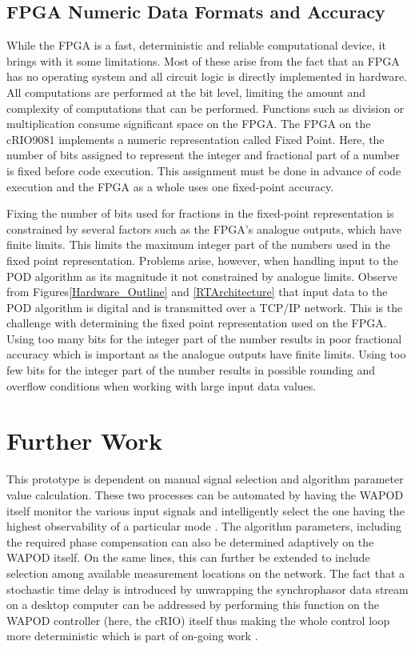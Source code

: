 \documentclass{ieeeaccess}
\begin{document}
\subsection{FPGA Numeric Data Formats and Accuracy}

While the FPGA is a fast, deterministic and reliable computational device, it brings with it some limitations. Most of these arise from the fact that an FPGA has no operating system and all circuit logic is directly implemented in hardware. All computations are performed at the bit level, limiting the amount and complexity of computations that can be performed. Functions such as division or multiplication consume significant space on the FPGA\cite{LabViewManuals}. The FPGA on the cRIO9081 implements a numeric representation called Fixed Point\cite{LabViewManuals}. Here, the number of bits assigned to represent the integer and fractional part of a number is fixed before code execution\cite{LabViewManuals}. This assignment must be done in advance of code execution and the FPGA as a whole uses one fixed-point accuracy.

Fixing the number of bits used for fractions in the fixed-point representation is constrained by several factors such as the FPGA\rq{s} analogue outputs, which have finite limits. This limits the maximum integer part of the numbers used in the fixed point representation. Problems arise, however, when handling input to the POD algorithm as its magnitude it not constrained by analogue limits. Observe from Figures\ref{Hardware_Outline} and \ref{RTArchitecture} that input data to the POD algorithm is digital and is transmitted over a TCP/IP network. This is the challenge with determining the fixed point representation used on the FPGA. Using too many bits for the integer part of the number results in poor fractional accuracy which is important as the analogue outputs have finite limits. Using too few bits for the integer part of the number results in possible rounding and overflow conditions when working with large input data values.

\section{Further Work}\label{Future}

This prototype is dependent on manual signal selection and algorithm parameter value calculation. These two processes can be automated by having the WAPOD itself monitor the various input signals and intelligently select the one having the highest observability of a particular mode \cite{Yuwa}. The algorithm parameters, including the required phase compensation can also be determined adaptively on the WAPOD itself. On the same lines, this can further be extended to include selection among available measurement locations on the network. The fact that a stochastic time delay is introduced by unwrapping the synchrophasor data stream on a desktop computer can be addressed by performing this function on the WAPOD controller (here, the cRIO) itself thus making the whole control loop more deterministic which is part of on-going work \cite{Audur}. 
\end{document}
